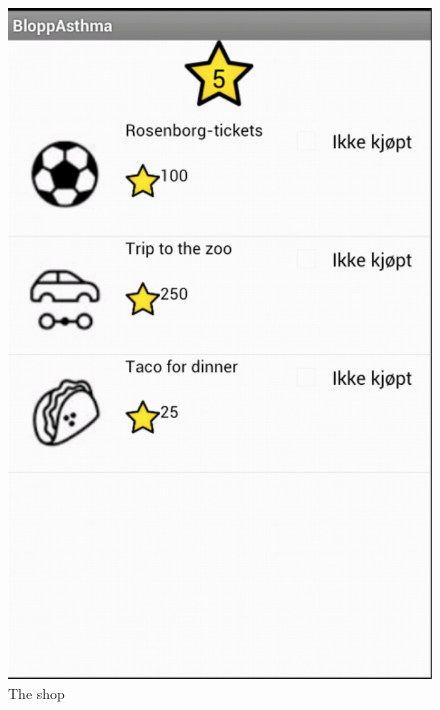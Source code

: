 \begin{figure}
\begin{minipage}[b]{0.4\linewidth}
			\includegraphics[width=0.20\paperwidth]{Pictures/app-screenshots/shop.png}
		\caption{The shop}
		\label{fig:capp_store}
	\end{minipage}
		\begin{minipage}[b]{0.4\linewidth}
		\centering

\end{minipage}
\end{figure}
